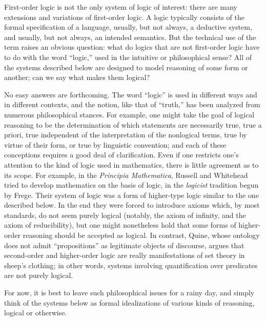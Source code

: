 \documentclass[../../../include/open-logic-section]{subfiles}
\begin{document}

First-order logic is not the only system of logic of interest: there
are many extensions and variations of first-order logic. A logic
typically consists of the formal specification of a language, usually,
but not always, a deductive system, and usually, but not always, an
intended semantics. But the technical use of the term raises an
obvious question: what do logics that are not first-order logic have
to do with the word ``logic,'' used in the intuitive or philosophical
sense? All of the systems described below are designed to model
reasoning of some form or another; can we say what makes them logical?

No easy answers are forthcoming. The word ``logic'' is used in
different ways and in different contexts, and the notion, like that of
``truth,'' has been analyzed from numerous philosophical stances. For
example, one might take the goal of logical reasoning to be the
determination of which statements are necessarily true, true a priori,
true independent of the interpretation of the nonlogical terms, true
by virtue of their form, or true by linguistic convention; and each of
these conceptions requires a good deal of clarification. Even if one
restricts one's attention to the kind of logic used in mathematics,
there is little agreement as to its scope. For example, in the
\textit{Principia Mathematica}, Russell and Whitehead tried to develop
mathematics on the basis of logic, in the {\em logicist} tradition
begun by Frege. Their system of logic was a form of higher-type logic
similar to the one described below. In the end they were forced to
introduce axioms which, by most standards, do not seem purely logical
(notably, the axiom of infinity, and the axiom of reducibility), but
one might nonetheless hold that some forms of higher-order reasoning
should be accepted as logical. In contrast, Quine, whose ontology does
not admit ``propositions'' as legitimate objects of discourse, argues
that second-order and higher-order logic are really manifestations of
set theory in sheep's clothing; in other words, systems involving
quantification over predicates are not purely logical.

For now, it is best to leave such philosophical issues for a rainy
day, and simply think of the systems below as formal idealizations of
various kinds of reasoning, logical or otherwise.
\end{document}
